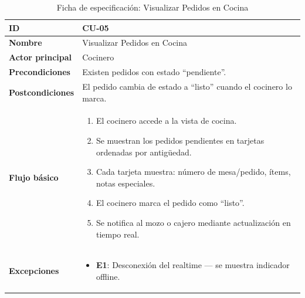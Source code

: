 \documentclass[12pt, a4paper]{article}
\begin{document}
\begin{table}[H]
\centering
\caption{Ficha de especificación: Visualizar Pedidos en Cocina}
\begin{tabularx}{\textwidth}{|l|X|}
    \hline
    \textbf{ID} & CU-05 \\ \hline
    \textbf{Nombre} & Visualizar Pedidos en Cocina \\ \hline
    \textbf{Actor principal} & Cocinero \\ \hline
    \textbf{Precondiciones} & Existen pedidos con estado ``pendiente''. \\ \hline
    \textbf{Postcondiciones} & El pedido cambia de estado a ``listo'' cuando el cocinero lo marca. \\ \hline
    \textbf{Flujo básico} &
    \begin{enumerate}[nosep, leftmargin=*]
        \item El cocinero accede a la vista de cocina.
        \item Se muestran los pedidos pendientes en tarjetas ordenadas por antigüedad.
        \item Cada tarjeta muestra: número de mesa/pedido, ítems, notas especiales.
        \item El cocinero marca el pedido como ``listo''.
        \item Se notifica al mozo o cajero mediante actualización en tiempo real.
    \end{enumerate} \\ \hline
    \textbf{Excepciones} &
    \begin{itemize}[nosep, leftmargin=*]
        \item \textbf{E1}: Desconexión del realtime --- se muestra indicador offline.
    \end{itemize} \\ \hline
\end{tabularx}
\end{table}
\end{document}
